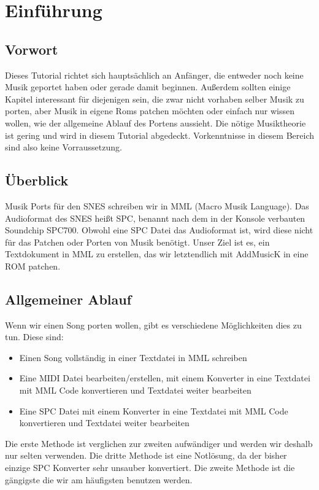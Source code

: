 

\section{Einführung}
\subsection{Vorwort}
Dieses Tutorial richtet sich hauptsächlich an Anfänger, die entweder noch keine Musik geportet haben oder gerade damit beginnen. Außerdem sollten einige Kapitel interessant für diejenigen sein, die zwar nicht vorhaben selber Musik zu porten, aber Musik in eigene Roms patchen möchten oder einfach nur wissen wollen, wie der allgemeine Ablauf des Portens aussieht.
Die nötige Musiktheorie ist gering und wird in diesem Tutorial abgedeckt. Vorkenntnisse in diesem Bereich sind also keine Vorraussetzung.

\newpage

\subsection{Überblick}

Musik Ports für den SNES schreiben wir in MML (Macro Musik Language). Das Audioformat des SNES heißt SPC, benannt nach dem in der Konsole verbauten Soundchip SPC700.
Obwohl eine SPC Datei das Audioformat ist, wird diese nicht für das Patchen oder Porten von Musik benötigt. Unser Ziel ist es, ein Textdokument in MML zu erstellen, das wir letztendlich mit AddMusicK in eine ROM patchen.


\subsection*{Allgemeiner Ablauf}
Wenn wir einen Song porten wollen, gibt es verschiedene Möglichkeiten dies zu tun. Diese sind:
\begin{itemize}
	\item Einen Song vollständig in einer Textdatei in MML schreiben
	\item Eine MIDI Datei bearbeiten/erstellen, mit einem Konverter in eine Textdatei mit MML Code konvertieren und Textdatei weiter bearbeiten
	\item Eine SPC Datei mit einem Konverter in eine Textdatei mit MML Code konvertieren und Textdatei weiter bearbeiten
\end{itemize}

\medskip

Die erste Methode ist verglichen zur zweiten aufwändiger und werden wir deshalb nur selten verwenden. Die dritte Methode ist eine Notlösung, da der bisher einzige SPC Konverter sehr unsauber konvertiert. Die zweite Methode ist die gängigste die wir am häufigsten benutzen werden. \\

